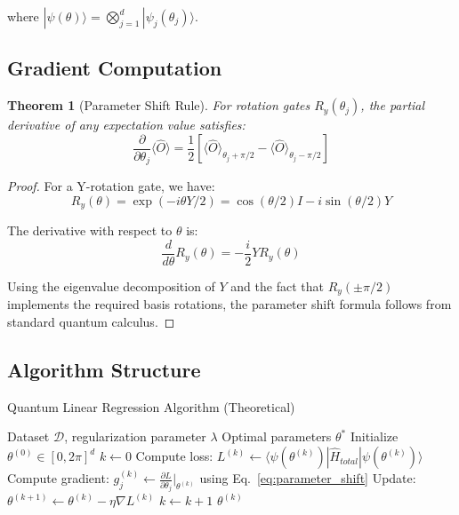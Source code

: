 \documentclass[11pt]{article}
\newtheorem{theorem}{Theorem}[section]
\begin{document}
where $|\psi(\theta)\rangle = \bigotimes_{j=1}^d |\psi_j(\theta_j)\rangle$.

\subsection{Gradient Computation}

\begin{theorem}[Parameter Shift Rule]
For rotation gates $R_y(\theta_j)$, the partial derivative of any expectation value satisfies:
\begin{equation}
\frac{\partial}{\partial \theta_j} \langle \hat{O} \rangle = \frac{1}{2} \left[ \langle \hat{O} \rangle_{\theta_j + \pi/2} - \langle \hat{O} \rangle_{\theta_j - \pi/2} \right]
\label{eq:parameter_shift}
\end{equation}
\end{theorem}

\begin{proof}
For a Y-rotation gate, we have:
\begin{equation}
R_y(\theta) = \exp(-i\theta Y/2) = \cos(\theta/2)I - i\sin(\theta/2)Y
\end{equation}

The derivative with respect to $\theta$ is:
\begin{equation}
\frac{d}{d\theta} R_y(\theta) = -\frac{i}{2} Y R_y(\theta)
\end{equation}

Using the eigenvalue decomposition of $Y$ and the fact that $R_y(\pm\pi/2)$ implements the required basis rotations, the parameter shift formula follows from standard quantum calculus.
\end{proof}

\subsection{Algorithm Structure}

\begin{algorithm}[H]
\caption{Quantum Linear Regression Algorithm (Theoretical)}
\begin{algorithmic}[1]
\Require Dataset $\mathcal{D}$, regularization parameter $\lambda$
\Ensure Optimal parameters $\theta^*$
\State Initialize $\theta^{(0)} \in [0, 2\pi]^d$
\State $k \leftarrow 0$
    \State Compute loss: $L^{(k)} \leftarrow \langle \psi(\theta^{(k)}) | \hat{H}_{total} | \psi(\theta^{(k)}) \rangle$
        \State Compute gradient: $g_j^{(k)} \leftarrow \frac{\partial L}{\partial \theta_j}\Big|_{\theta^{(k)}}$ using Eq.~\eqref{eq:parameter_shift}
    \EndFor
    \State Update: $\theta^{(k+1)} \leftarrow \theta^{(k)} - \eta \nabla L^{(k)}$
    \State $k \leftarrow k + 1$
\EndWhile
\Return $\theta^{(k)}$
\end{algorithmic}
\end{algorithm}
\end{document}
